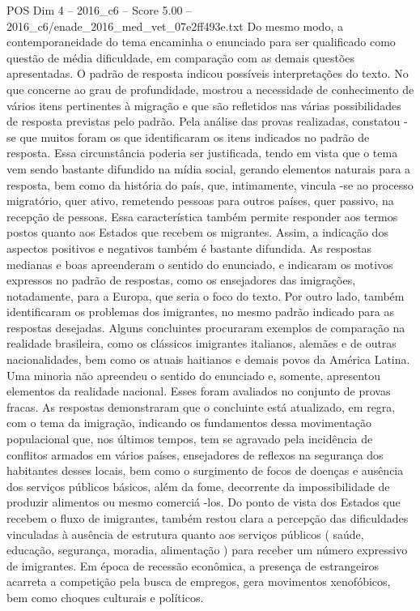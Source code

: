 \begin{textsample}{POS Dim 4 – 2016\_c6 – Score 5.00 – 2016\_c6/enade\_2016\_med\_vet\_07e2ff493e.txt}
Do mesmo modo, a contemporaneidade do tema encaminha o enunciado para ser qualificado como questão de média dificuldade, em comparação com as demais questões apresentadas.
O padrão de resposta indicou possíveis interpretações do texto.
No que concerne ao grau de profundidade, mostrou a necessidade de conhecimento de vários itens pertinentes à migração e que são refletidos nas várias possibilidades de resposta previstas pelo padrão.
Pela análise das provas realizadas, constatou -se que muitos foram os que identificaram os itens indicados no padrão de resposta.
Essa circunstância poderia ser justificada, tendo em vista que o tema vem sendo bastante difundido na mídia social, gerando elementos naturais para a resposta, bem como da história do país, que, intimamente, vincula -se ao processo migratório, quer ativo, remetendo pessoas para outros países, quer passivo, na recepção de pessoas.
Essa característica também permite responder aos termos postos quanto aos Estados que recebem os migrantes.
Assim, a indicação dos aspectos positivos e negativos também é bastante difundida.
As respostas medianas e boas apreenderam o sentido do enunciado, e indicaram os motivos expressos no padrão de respostas, como os ensejadores das imigrações, notadamente, para a Europa, que seria o foco do texto.
Por outro lado, também identificaram os problemas dos imigrantes, no mesmo padrão indicado para as respostas desejadas.
Alguns concluintes procuraram exemplos de comparação na realidade brasileira, como os clássicos imigrantes italianos, alemães e de outras nacionalidades, bem como os atuais haitianos e demais povos da América Latina.
Uma minoria não apreendeu o sentido do enunciado e, somente, apresentou elementos da realidade nacional.
Esses foram avaliados no conjunto de provas fracas.
As respostas demonstraram que o concluinte está atualizado, em regra, com o tema da imigração, indicando os fundamentos dessa movimentação populacional que, nos últimos tempos, tem se agravado pela incidência de conflitos armados em vários países, ensejadores de reflexos na segurança dos habitantes desses locais, bem como o surgimento de focos de doenças e ausência dos serviços públicos básicos, além da fome, decorrente da impossibilidade de produzir alimentos ou mesmo comerciá -los.
Do ponto de vista dos Estados que recebem o fluxo de imigrantes, também restou clara a percepção das dificuldades vinculadas à ausência de estrutura quanto aos serviços públicos ( saúde, educação, segurança, moradia, alimentação ) para receber um número expressivo de imigrantes.
Em época de recessão econômica, a presença de estrangeiros acarreta a competição pela busca de empregos, gera movimentos xenofóbicos, bem como choques culturais e políticos.

\end{textsample}
